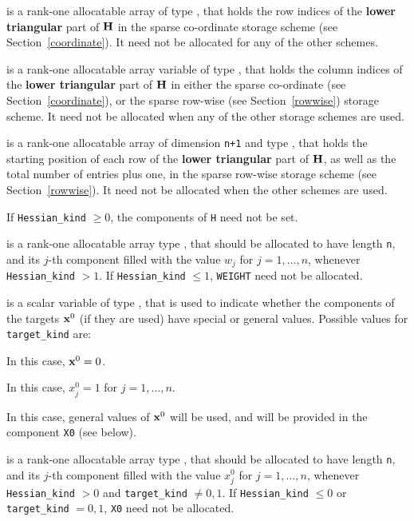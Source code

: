 \documentclass{galahad}
\begin{document}
\begin{description}
\begin{description}
 is a rank-one allocatable array of type \integer,
that holds the row indices of the {\bf lower triangular} part of ${\mathbf{H}}$
in the sparse co-ordinate storage scheme (see Section~\ref{coordinate}).
It need not be allocated for any of the other schemes.

 is a rank-one allocatable array variable of type \integer,
that holds the column indices of the {\bf lower triangular} part of
${\mathbf{H}}$ in either the sparse co-ordinate
(see Section~\ref{coordinate}), or the sparse row-wise
(see Section~\ref{rowwise}) storage scheme.
It need not be allocated when any of the other storage schemes are used.

 is a rank-one allocatable array of dimension {\tt n+1} and type
\integer, that holds the starting position of
each row of the {\bf lower triangular} part of ${\mathbf{H}}$, as well
as the total number of entries plus one, in the sparse row-wise storage
scheme (see Section~\ref{rowwise}). It need not be allocated when the
other schemes are used.
\end{description}
If {\tt Hessian\_kind} $\geq 0$, the components of {\tt H} need not be set.

 is a rank-one allocatable array type \realdp, that
should be allocated to have length {\tt n}, and its $j$-th component
filled with the value $w_{j}$ for $j = 1, \ldots , n$,
whenever {\tt Hessian\_kind} $>1$.
If {\tt Hessian\_kind} $\leq 1$, {\tt WEIGHT} need not be allocated.

 is a scalar variable of type \integer,
that is used to indicate whether the components of the targets ${\mathbf{x}}^0$
(if they are used) have special or general values. Possible values for
{\tt target\_kind} are:
\begin{description}
  In this case, ${\mathbf{x}}^0 = 0$.

 In this case, $x^0_{j} = 1$ for $j = 1, \ldots , n$.

 In this case, general values of ${\mathbf{x}}^0$ will be used,
     and will be provided in the component {\tt X0} (see below).
\end{description}

 is a rank-one allocatable array type \realdp, that
should be allocated to have length {\tt n}, and its $j$-th component
filled with the value $x_{j}^0$ for $j = 1, \ldots , n$,
whenever {\tt Hessian\_kind} $>0$ and {\tt target\_kind} $\neq 0,1$.
If {\tt Hessian\_kind} $\leq 0$ or {\tt target\_kind} $= 0,1$,
{\tt X0} need not be allocated.


\end{description}
\end{document}
